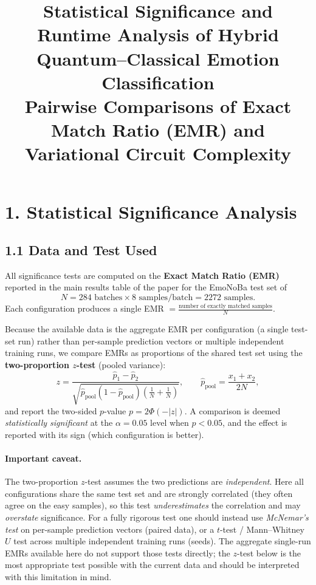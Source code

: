 \documentclass[11pt]{article}
\title{\textbf{Statistical Significance and Runtime Analysis of Hybrid Quantum--Classical Emotion Classification}\\
\large Pairwise Comparisons of Exact Match Ratio (EMR) and Variational Circuit Complexity}
\author{}
\date{}
\begin{document}
\maketitle

\section*{1. Statistical Significance Analysis}

\subsection*{1.1 Data and Test Used}

All significance tests are computed on the \textbf{Exact Match Ratio (EMR)} reported in the main results table
of the paper for the EmoNoBa test set of
\[
N = 284 \text{ batches} \times 8 \text{ samples/batch} = 2272 \text{ samples}.
\]
Each configuration produces a single EMR $= \frac{\text{number of exactly matched samples}}{N}$.

Because the available data is the aggregate EMR per configuration (a single test-set run) rather than
per-sample prediction vectors or multiple independent training runs, we compare EMRs as proportions of the
shared test set using the \textbf{two-proportion $z$-test} (pooled variance):
\[
z = \frac{\hat{p}_1 - \hat{p}_2}{\sqrt{\hat{p}_{\text{pool}}(1 - \hat{p}_{\text{pool}})\left(\frac{1}{N} + \frac{1}{N}\right)}},
\qquad
\hat{p}_{\text{pool}} = \frac{x_1 + x_2}{2N},
\]
and report the two-sided $p$-value $p = 2\Phi(-|z|)$. A comparison is deemed \emph{statistically significant}
at the $\alpha = 0.05$ level when $p < 0.05$, and the effect is reported with its sign (which configuration
is better).

\paragraph{Important caveat.} The two-proportion $z$-test assumes the two predictions are \emph{independent}.
Here all configurations share the same test set and are strongly correlated (they often agree on the easy
samples), so this test \emph{underestimates} the correlation and may \emph{overstate} significance. For a
fully rigorous test one should instead use \emph{McNemar's test} on per-sample prediction vectors (paired
data), or a $t$-test / Mann--Whitney $U$ test across multiple independent training runs (seeds). The
aggregate single-run EMRs available here do not support those tests directly; the $z$-test below is the
most appropriate test possible with the current data and should be interpreted with this limitation in
mind.
\end{document}
